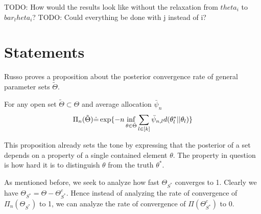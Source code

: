 
TODO: How would the results look like without the relaxation from $theta_i$ to $bar_theta_i$?
TODO: Could everything be done with j instead of i?

\section{Statements}\label{section:optimal_statements}
Russo proves a proposition about the posterior convergence rate of general parameter sets $\tilde{\Theta}$.

\begin{proposition}\label{proposition:prop5}
  For any open set $\tilde{\Theta} \subset \Theta$ and average allocation $\bar{\psi}_n$
  \[\Pi_n(\tilde{\Theta}) \dot{=} \exp\{-n \inf_{\theta \in \tilde{\Theta}} \sum_{l \in [k]} \bar{\psi}_{n, l} d(\theta^*_l || \theta_l)\}\]
\end{proposition}

This proposition already sets the tone by expressing that the posterior of a set depends on a property of a single contained element $\theta$. The property in question is how hard it is to distinguish $\theta$ from the truth $\theta^*$.

As mentioned before, we seek to analyze how fast $\Theta_{S^*}$ converges to 1. Clearly we have $\Theta_{S^*} = \Theta - \Theta_{S^*}^c$. Hence instead of analyzing the rate of convergence of $\Pi_n(\Theta_{S^*})$ to 1, we can analyze the rate of convergence of $\Pi(\Theta_{S^*}^c)$ to 0.

